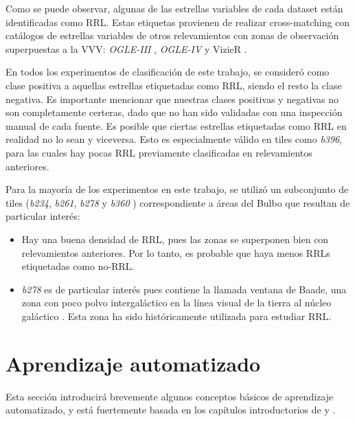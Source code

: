 \par Como se puede observar, algunas de las estrellas variables de cada dataset están identificadas como RRL. Estas etiquetas provienen de realizar cross-matching con catálogos de estrellas variables de otros relevamientos con zonas de observación superpuestas a la VVV: \textit{OGLE-III} \cite{Udalski}, \textit{OGLE-IV} \cite{Udalski2} y VizieR \cite{vizier}. \\

\par En todos los experimentos de clasificación de este trabajo, se consideró como clase positiva a aquellas estrellas etiquetadas como RRL, siendo el resto la clase negativa. Es importante mencionar que nuestras clases positivas y negativas no son completamente certeras, dado que no han sido validadas con una inspección manual de cada fuente. Es posible que ciertas estrellas etiquetadas como RRL en realidad no lo sean y viceversa. Esto es especialmente válido en tiles como \textit{b396}, para las cuales hay pocas RRL previamente clasificadas en relevamientos anteriores. \\

\par Para la mayoría de los experimentos en este trabajo, se utilizó un subconjunto de tiles (\textit{b234}, \textit{b261}, \textit{b278} y \textit{b360} ) correspondiente a áreas del Bulbo que resultan de particular interés:

\begin{itemize}
\item Hay una buena densidad de RRL, pues las zonas se superponen bien con relevamientos anteriores. Por lo tanto, es probable que haya menos RRLs etiquetadas como no-RRL.

\item \textit{b278} es de particular interés pues contiene la llamada ventana de Baade, una zona con poco polvo intergaláctico en la línea visual de la tierra al núcleo galáctico \cite{Baade}. Esta zona ha sido históricamente utilizada para estudiar RRL.

\end{itemize}

\section {Aprendizaje automatizado}

Esta sección introducirá brevemente algunos conceptos básicos de aprendizaje automatizado, y está fuertemente basada en los capítulos introductorios de \cite{mitchell} y \cite{statisticallearning}.

